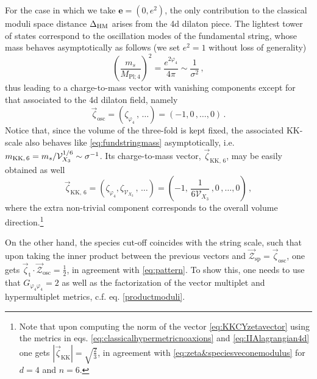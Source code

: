 For the case in which we take $\mathbf{e}=(0, e^2)$, the only contribution to the classical moduli space distance $\Delta_{\rm HM}$ arises from the 4d dilaton piece. The lightest tower of states correspond to the oscillation modes of the fundamental string, whose mass behaves asymptotically as follows (we set $e^2=1$ without loss of generality)
%
\begin{equation}\label{eq:fundstringmass}
	\left(\frac{m_s}{M_{\text{Pl;}\, 4}} \right)^2= \frac{ e^{2\varphi_4}}{4 \pi} \sim \frac{1}{\sigma^2}\, ,
\end{equation}
%
thus leading to a charge-to-mass vector with vanishing components except for that associated to the 4d dilaton field, namely 
%
\begin{equation}
	\vec{\zeta}_{\text{osc}} = \left(\zeta_{\varphi_4}\, ,\, \ldots\right)= \left(-1, 0\, , \ldots, 0\right)\, .
\end{equation}
%
Notice that, since the volume of the three-fold is kept fixed, the associated KK-scale also behaves like \eqref{eq:fundstringmass} asymptotically, i.e. $m_{\rm KK,\, 6} = m_s/\mathcal{V}_{X_3}^{1/6} \sim \sigma^{-1}$. Its charge-to-mass vector, $\vec{\zeta}_{\text{KK},\, 6}$, may be easily obtained as well
%
\begin{equation}\label{eq:KKCYzetavector}
	\vec{\zeta}_{\text{KK},\, 6} = \left(\zeta_{\varphi_4},\zeta_{\mathcal{V}_{X_3}}\, ,\, \ldots\right)= \left(-1,\, \frac{1}{6\mathcal{V}_{X_3}}\, ,0\, , \ldots, 0\right)\, ,
\end{equation}
%
where the extra non-trivial component corresponds to the overall volume direction.\footnote{Note that upon computing the norm of the vector \eqref{eq:KKCYzetavector} using the metrics in eqs. \eqref{eq:classicalhypermetricnoaxions} and \eqref{eq:IIAlagrangian4d} one gets $|\vec{\zeta}_{\text{KK}}|=\sqrt{\frac{2}{3}}$, in agreement with \eqref{eq:zeta&speciesveconemodulus} for $d=4$ and $n=6$.} 

On the other hand, the species cut-off coincides with the string scale, such that upon taking the inner product between the previous vectors and $\vec{\mathcal{Z}}_{\text{sp}}=\vec{\zeta}_{\text{osc}}$, one gets $\vec{\zeta}_{\text{t}} \cdot \vec{\mathcal{Z}}_{\text{osc}} = \frac{1}{2}$, in agreement with \eqref{eq:pattern}. To show this, one needs to use that $G_{\varphi_4 \varphi_4}=2$ as well as the factorization of the vector multiplet and hypermultiplet metrics, c.f. eq. \eqref{productmoduli}.
	
